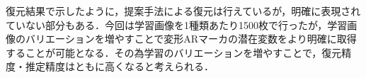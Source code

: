 復元結果で示したように，提案手法による復元は行えているが，明確に表現されていない部分もある．今回は学習画像を1種類あたり1500枚で行ったが，学習画像のバリエーションを増やすことで変形ARマーカの潜在変数をより明確に取得することが可能となる．その為学習のバリエーションを増やすことで，復元精度・推定精度はともに高くなると考えられる．
















